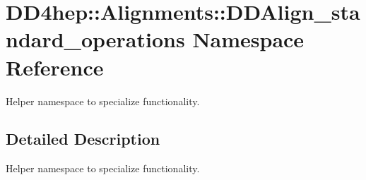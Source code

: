 \hypertarget{namespace_d_d4hep_1_1_alignments_1_1_d_d_align__standard__operations}{
\section{DD4hep::Alignments::DDAlign\_\-standard\_\-operations Namespace Reference}
\label{namespace_d_d4hep_1_1_alignments_1_1_d_d_align__standard__operations}
}


Helper namespace to specialize functionality.  


\subsection{Detailed Description}
Helper namespace to specialize functionality. 